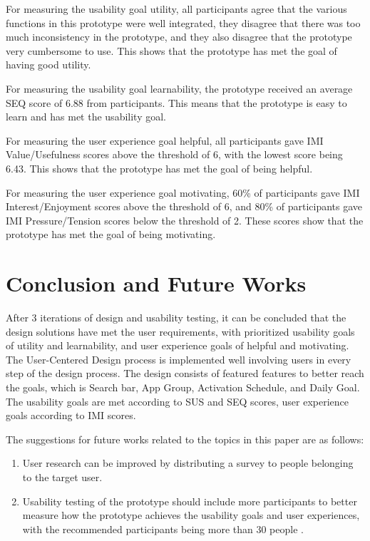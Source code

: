 \documentclass[conference]{IEEEtran}
\begin{document}
For measuring the usability goal utility, all participants agree that the various functions in this prototype were well integrated, they disagree that there was too much inconsistency in the prototype, and they also disagree that the prototype very cumbersome to use. This shows that the prototype has met the goal of having good utility.

For measuring the usability goal learnability, the prototype received an average SEQ score of 6.88 from participants. This means that the prototype is easy to learn and has met the usability goal. 

For measuring the user experience goal helpful, all participants gave IMI Value/Usefulness scores above the threshold of 6, with the lowest score being 6.43. This shows that the prototype has met the goal of being helpful.

For measuring the user experience goal motivating, 60\% of participants gave IMI Interest/Enjoyment scores above the threshold of 6, and 80\% of participants gave IMI Pressure/Tension scores below the threshold of 2. These scores show that the prototype has met the goal of being motivating.

\section{Conclusion and Future Works}

After 3 iterations of design and usability testing, it can be concluded that the design solutions have met the user requirements, with prioritized usability goals of utility and learnability, and user experience goals of helpful and motivating. The User-Centered Design process is implemented well involving users in every step of the design process. The design consists of featured features to better reach the goals, which is Search bar, App Group, Activation Schedule, and Daily Goal. The usability goals are met according to SUS and SEQ scores, user experience goals according to IMI scores. 
 
The suggestions for future works related to the topics in this paper are as follows:
\begin{enumerate}
  \item User research can be improved by distributing a survey to people belonging to the target user.
  \item Usability testing of the prototype should include more participants to better measure how the prototype achieves the usability goals and user experiences, with the recommended participants being more than 30 people \cite{nielsengrouptesting}.
\end{enumerate}




\vspace{12pt}
\end{document}
